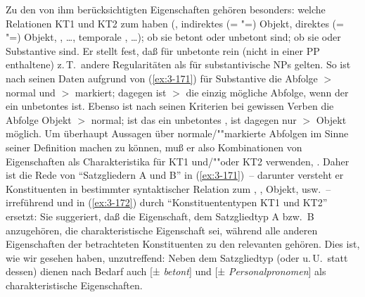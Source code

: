 \documentclass[output=paper]{langsci/langscibook}
\begin{document}
Zu den von ihm berücksichtigten Eigenschaften gehören besonders:
welche Relationen KT1 und KT2 zum  haben (, indirektes (=
"=) Objekt, direktes (= "=) Objekt, ,
\ldots, temporale , \ldots); ob sie betont oder unbetont sind; ob
sie  oder Substantive sind. Er stellt fest, daß für
unbetonte rein  (nicht in einer PP enthaltene)
 z.\,T.\ andere Regularitäten als für substantivische
NPs gelten. So ist nach seinen Daten aufgrund von (\ref{ex:3-171}) für
Substantive die Abfolge  $>$  normal und  $>$ 
markiert; dagegen ist  $>$  die einzig mögliche Abfolge,
wenn der  ein unbetontes  ist. Ebenso ist
nach seinen Kriterien bei gewissen Verben die Abfolge Objekt $>$ 
normal; ist das  ein unbetontes , ist dagegen
nur  $>$ Objekt möglich. Um überhaupt Aussagen über
normale/""markierte Abfolgen im Sinne seiner Definition machen zu
können, muß er also Kombinationen von Eigenschaften als
Charakteristika für KT1 und/""oder KT2 verwenden, . Daher ist die Rede von
"`Satzgliedern A und B"' in (\ref{ex:3-171})~-- darunter versteht er Konstituenten
in bestimmter syntaktischer Relation zum , \zb {}, Objekt,
 usw.~-- irreführend und in (\ref{ex:3-172}) durch "`Konstituententypen
KT1 und KT2"' ersetzt: Sie suggeriert, daß die Eigenschaft, dem
Satzgliedtyp A bzw.\ B anzugehören, die charakteristische Eigenschaft
sei, während alle anderen Eigenschaften der betrachteten Konstituenten
zu den relevanten  gehören. Dies ist, wie wir
gesehen haben, unzutreffend: Neben dem Satzgliedtyp (oder u.\,U.\ statt
dessen) dienen nach Bedarf auch [± \textit{betont}] und [± \textit{Personalpronomen}]
als charakteristische Eigenschaften.
\end{document}
